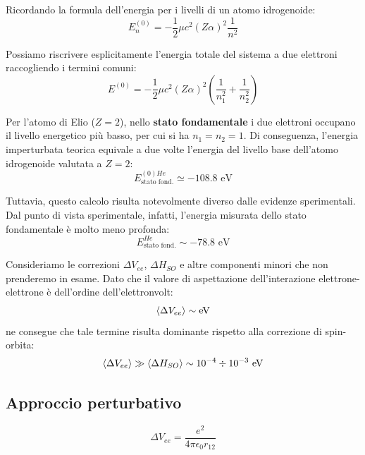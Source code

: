 Ricordando la formula dell'energia per i livelli di un atomo idrogenoide:
\begin{equation}
    E_n^{(0)} = -\frac{1}{2} \mu c^2 (Z\alpha)^2 \frac{1}{n^2}
\end{equation}

Possiamo riscrivere esplicitamente l'energia totale del sistema a due elettroni raccogliendo i termini comuni:
\begin{equation}
    E^{(0)} = -\frac{1}{2} \mu c^2 (Z\alpha)^2 \left( \frac{1}{n_1^2} + \frac{1}{n_2^2} \right)
\end{equation}

Per l'atomo di Elio (\(Z=2\)), nello \textbf{stato fondamentale} i due elettroni occupano il livello energetico più basso, per cui si ha \(n_1 = n_2 = 1\). Di conseguenza, l'energia imperturbata teorica equivale a due volte l'energia del livello base dell'atomo idrogenoide valutata a \(Z=2\):
\begin{equation}
    E_{\text{stato fond.}}^{(0) He} \simeq -108.8 \text{ eV}
\end{equation}

Tuttavia, questo calcolo risulta notevolmente diverso dalle evidenze sperimentali. Dal punto di vista sperimentale, infatti, l'energia misurata dello stato fondamentale è molto meno profonda:
\begin{equation}
    E_{\text{stato fond.}}^{He} \sim -78.8 \text{ eV}
\end{equation}


Consideriamo le correzioni \(\Delta V_{ee}\), \(\Delta H_{SO}\) e altre componenti minori che non prenderemo in esame. 
Dato che il valore di aspettazione dell'interazione elettrone-elettrone è dell'ordine dell'elettronvolt:
\begin{equation}
    \expval{\Delta V_{ee}} \sim \text{eV}
\end{equation}
ne consegue che tale termine risulta dominante rispetto alla correzione di spin-orbita:
\begin{equation}
    \expval{\Delta V_{ee}} \gg \expval{\Delta H_{SO}} \sim 10^{-4} \divisionsymbol 10^{-3} \text{ eV}   
\end{equation}

\subsection{Approccio perturbativo}
\begin{equation}
    \Delta V_{ee} = \frac{e^2}{4\pi \epsilon_0 r_{12}}
\end{equation}

